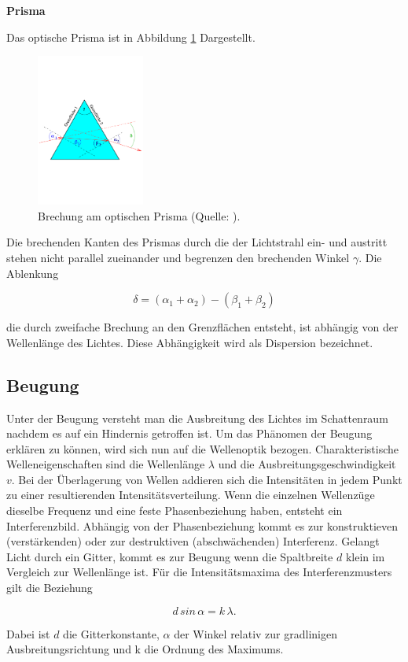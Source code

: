 \newpage
\noindent
\textbf{Prisma}

\noindent
Das optische Prisma ist in Abbildung \ref{fig:prism} Dargestellt.

\begin{figure}
    \centering
       \includegraphics[height=5cm]{prism.pdf}
       \caption{Brechung am optischen Prisma (Quelle: \cite{V400}).}
       \label{fig:prism}
\end{figure}

\noindent
Die brechenden Kanten des Prismas durch die der Lichtstrahl ein- und austritt stehen nicht parallel zueinander und begrenzen den brechenden Winkel $\gamma$.
Die Ablenkung 

\begin{equation}
    \delta = ( \alpha_1 + \alpha_2) - (\beta_1 + \beta_2)
\end{equation}

\noindent
die durch zweifache Brechung an den Grenzflächen entsteht, 
ist abhängig von der Wellenlänge des Lichtes. 
Diese Abhängigkeit wird als Dispersion bezeichnet.

\subsection{Beugung}
Unter der Beugung versteht man die Ausbreitung des Lichtes im Schattenraum nachdem es auf ein Hindernis getroffen ist.
Um das Phänomen der Beugung erklären zu können, 
wird sich nun auf die Wellenoptik bezogen.
Charakteristische Welleneigenschaften sind die Wellenlänge $\lambda$ 
und die Ausbreitungsgeschwindigkeit $v$.
Bei der Überlagerung von Wellen addieren sich die Intensitäten in jedem Punkt zu einer resultierenden Intensitätsverteilung.
Wenn die einzelnen Wellenzüge dieselbe Frequenz und eine feste Phasenbeziehung haben,
entsteht ein Interferenzbild.
Abhängig von der Phasenbeziehung kommt es zur konstruktieven (verstärkenden) oder zur destruktiven (abschwächenden) Interferenz.
Gelangt Licht durch ein Gitter, kommt es zur Beugung wenn die Spaltbreite $d$ klein im Vergleich zur Wellenlänge ist.
Für die Intensitätsmaxima des Interferenzmusters gilt die Beziehung

\begin{equation}
d \, sin \, \alpha = k\, \lambda.
\label{eqn:beug}
\end{equation}

\noindent
Dabei ist $d$ die Gitterkonstante, $\alpha$ der Winkel relativ zur gradlinigen Ausbreitungsrichtung und k die Ordnung des Maximums.


